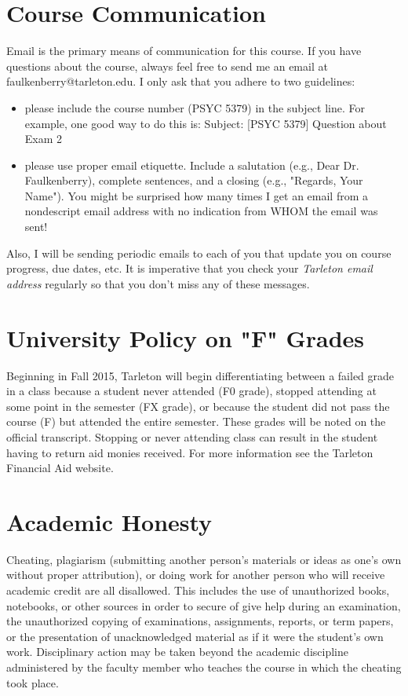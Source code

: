 \documentclass[10pt]{article}
\begin{document}
\section*{Course Communication}
\label{sec-7}

Email is the primary means of communication for this course.  If you have questions about the course, always feel free to send me an email at faulkenberry@tarleton.edu.  I only ask that you adhere to two guidelines:
\begin{itemize}
\item please include the course number (PSYC 5379) in the subject line.  For example, one good way to do this is:  Subject: [PSYC 5379] Question about Exam 2
\item please use proper email etiquette.  Include a salutation (e.g., Dear Dr. Faulkenberry), complete sentences, and a closing (e.g., "Regards, Your Name").  You might be surprised how many times I get an email from a nondescript email address with no indication from WHOM the email was sent!
\end{itemize}

Also, I will be sending periodic emails to each of you that update you on course progress, due dates, etc.  It is imperative that you check your \emph{Tarleton email address} regularly so that you don't miss any of these messages.

\section*{University Policy on "F" Grades}
\label{sec-8}
Beginning in Fall 2015, Tarleton will begin differentiating between a 
failed grade in a class because a student never attended (F0 grade), 
stopped attending at some point in the semester (FX grade), or because 
the student did not pass the course (F) but attended the entire semester. 
These grades will be noted on the official transcript. Stopping or never 
attending class can result in the student having to return aid monies 
received.  For more information see the Tarleton Financial Aid website.

\section*{Academic Honesty}
\label{sec-9}

Cheating, plagiarism (submitting another person’s materials or ideas as one’s own without proper attribution), or doing work for another person who will receive academic credit are all disallowed. This includes the use of unauthorized books, notebooks, or other sources in order to secure of give help during an examination, the unauthorized copying of examinations, assignments, reports, or term papers, or the presentation of unacknowledged material as if it were the student’s own work. Disciplinary action may be taken beyond the academic discipline administered by the faculty member who teaches the course in which the cheating took place.
\end{document}
